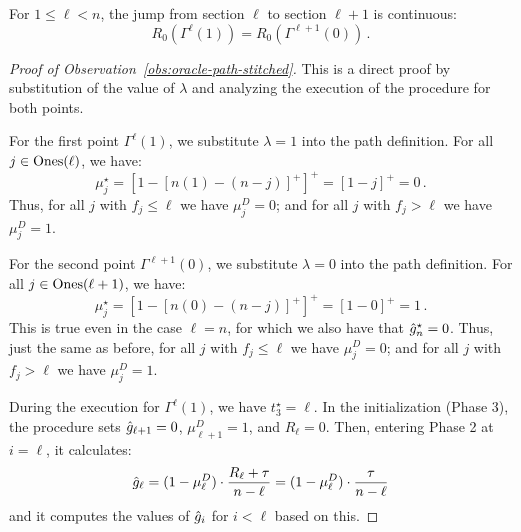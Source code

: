 \begin{observation}\label{obs:oracle-path-stitched}
    For $1 \leq \ell<n$, the jump from section $\ell$ to section $\ell+1$ is continuous:
    \begin{equation*}
        R_0(\Gamma^{\ell}(1)) = R_0(\Gamma^{\ell+1}(0))\,.
    \end{equation*}
\end{observation}
\begin{proof}[Proof of Observation~\ref{obs:oracle-path-stitched}]
    This is a direct proof by substitution of the value of $\lambda$ and analyzing the execution of the procedure for both points. 
    
    For the first point $\Gamma^\ell(1)$, we substitute $\lambda=1$ into the path definition. For all $j \in \text{Ones}(\ell)$, we have:
    \begin{equation*}
        \mu_j^\star = \left[1 - \left[n(1) - (n-j)\right]^+\right]^+ = \left[1 - j\right]^+ = 0\,.
    \end{equation*}
    Thus, for all $j$ with $f_j\leq \ell$ we have $\mu_j^D=0$; and for all $j$ with $f_j>\ell$ we have $\mu_j^D=1$.
    
    For the second point $\Gamma^{\ell+1}(0)$, we substitute $\lambda=0$ into the path definition. For all $j \in \text{Ones}(\ell+1)$, we have:
    \begin{equation*}
        \mu_j^\star = \left[1 - \left[n(0) - (n-j)\right]^+\right]^+ = \left[1 - 0\right]^+ = 1\,.
    \end{equation*}
    This is true even in the case $\ell=n$, for which we also have that $\hat{g}_n^\star=0$. Thus, just the same as before, for all $j$ with $f_j\leq \ell$ we have $\mu_j^D=0$; and for all $j$ with $f_j>\ell$ we have $\mu_j^D=1$.
    
    During the execution for $\Gamma^\ell(1)$, we have $t_3^\star = \ell$. In the initialization (Phase 3), the procedure sets $\hat{g}_{\ell+1} = 0$, $\mu_{\ell+1}^D=1$, and $R_\ell = 0$. Then, entering Phase 2 at $i = \ell$, it calculates:
    \begin{equation*}
        \hat{g}_\ell = (1 - \mu_\ell^D) \cdot \frac{R_\ell + \tau}{n - \ell} = (1 - \mu_\ell^D) \cdot \frac{\tau}{n - \ell}
    \end{equation*}
    and it computes the values of $\hat{g}_i$ for $i<\ell$ based on this.
    

\end{proof}
